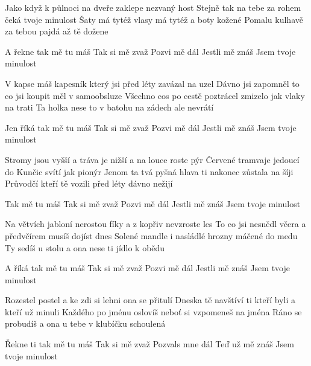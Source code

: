 \begin{text}
Jako když k půlnoci na dveře zaklepe nezvaný host
Stejně tak na tebe za rohem čeká tvoje minulost 
Šaty má tytéž vlasy má tytéž a boty kožené
Pomalu kulhavě za tebou pajdá až tě dožene

A řekne tak mě tu máš 
Tak si mě zvaž
Pozvi mě dál 
Jestli mě znáš
Jsem tvoje minulost

V kapse máš kapesník který jsi před léty zavázal na uzel
Dávno jsi zapomněl to co jsi koupit měl v samoobsluze
Všechno cos po cestě poztrácel zmizelo jak vlaky na trati
Ta holka nese to v batohu na zádech ale nevrátí

Jen říká tak mě tu máš 
Tak si mě zvaž
Pozvi mě dál 
Jestli mě znáš
Jsem tvoje minulost

Stromy jsou vyšší a tráva je nižší a na louce roste pýr
Červené tramvaje jedoucí do Kunčic svítí jak pionýr
Jenom ta tvá pyšná hlava ti nakonec zůstala na šíji
Průvodčí kteří tě vozili před léty dávno nežijí

Tak mě tu máš 
Tak si mě zvaž
Pozvi mě dál 
Jestli mě znáš
Jsem tvoje minulost

Na větvích jabloní nerostou fíky a z kopřiv nevzroste les
To co jsi nesnědl včera a předvčírem musíš dojíst dnes
Solené mandle i nasládlé hrozny máčené do medu
Ty sedíš u stolu a ona nese ti jídlo k obědu

A říká tak mě tu máš 
Tak si mě zvaž
Pozvi mě dál 
Jestli mě znáš
Jsem tvoje minulost

Rozestel postel a ke zdi si lehni ona se přitulí
Dneska tě navštíví ti kteří byli a kteří už minuli
Každého po jménu oslovíš neboť si vzpomeneš na jména
Ráno se probudíš a ona u tebe v klubíčku schoulená

Řekne ti tak mě tu máš 
Tak si mě zvaž
Pozvals mne dál 
Teď už mě znáš
Jsem tvoje minulost
\end{text}